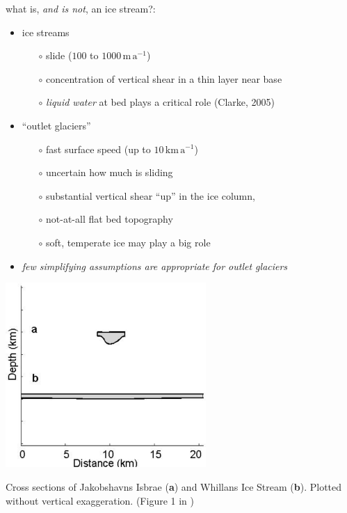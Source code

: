 \documentclass[titlepage,letterpaper,final,12pt]{scrartcl}
\newcommand{\alert}[1]{\emph{#1}}
\begin{document}
what is, \emph{and is not}, an ice stream?:

\begin{itemize}
\item ice streams 
  \begin{itemize}
  \item[$\circ$] slide ($100$ to $1000 \,\text{m}\,\text{a}^{-1}$)
  \item[$\circ$] concentration of vertical shear in a thin layer near base
  \item[$\circ$] \emph{liquid water} at bed plays a critical role (Clarke, 2005)\nocite{Clarke05}
  \end{itemize}
\item ``outlet glaciers''
  \begin{itemize}
  \item[$\circ$] fast surface speed (up to $10 \,\text{km}\,\text{a}^{-1}$)
  \item[$\circ$] uncertain how much is sliding
  \item[$\circ$] substantial vertical shear ``up'' in the ice column,
  \item[$\circ$] not-at-all flat bed topography
  \item[$\circ$] soft, temperate ice may play a big role
  \end{itemize} 
\item \alert{few simplifying assumptions are appropriate for outlet glaciers}
\end{itemize}

\begin{center}
\includegraphics[width=3.0in]{streamisbrae}

Cross sections of Jakobshavns Isbrae (\textbf{a}) and Whillans Ice Stream (\textbf{b}).  Plotted without vertical exaggeration.  (Figure 1 in \cite{TrufferEchelmeyer})
\end{center}
\end{document}
